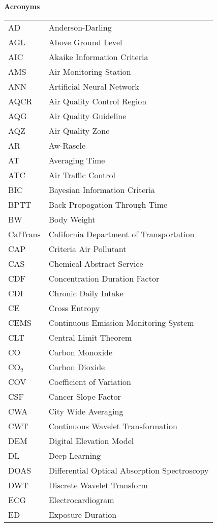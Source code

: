 \LARGE
\textbf{Acronyms}

\small

\begin{longtable}{ll}
AD & Anderson-Darling \\
AGL & Above Ground Level \\
AIC & Akaike Information Criteria \\
AMS & Air Monitoring Station \\
ANN & Artificial Neural Network \\
AQCR & Air Quality Control Region \\
AQG & Air Quality Guideline \\
AQZ & Air Quality Zone \\
AR & Aw-Rascle \\
AT & Averaging Time \\
ATC & Air Traffic Control \\
BIC & Bayesian Information Criteria \\
BPTT & Back Propogation Through Time \\
BW & Body Weight \\
CalTrans & California Department of Transportation \\
CAP & Criteria Air Pollutant \\
CAS & Chemical Abstract Service \\
CDF & Concentration Duration Factor \\
CDI & Chronic Daily Intake \\
CE & Cross Entropy \\
CEMS & Continuous Emission Monitoring System \\
CLT & Central Limit Theorem \\
CO & Carbon Monoxide \\
CO$_{2}$ & Carbon Dioxide \\
COV & Coefficient of Variation \\
CSF & Cancer Slope Factor \\
CWA & City Wide Averaging \\
CWT & Continuous Wavelet Transformation \\
DEM & Digital Elevation Model \\
DL & Deep Learning \\
DOAS & Differential Optical Absorption Spectroscopy \\
DWT & Discrete Wavelet Transform \\
ECG & Electrocardiogram \\
ED & Exposure Duration \\

\end{longtable}

